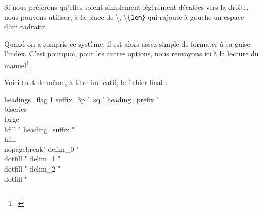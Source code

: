 Si nous préférons qu'elles soient simplement légèrement décalées vers la droite, nous pouvons utiliser, à la place de \textbackslash{}, \textbackslash{}\verb|{1em}| qui rajoute à gauche un espace d'un cadratin. 


Quand on a compris ce système, il est alors assez simple de formater à sa guise l'index. C'est pourquoi, pour les autres options, nous renvoyons ici à la lecture du manuel\footcite[On pourra aussi consulter][]{frama_index}. 

Voici tout de même, à titre indicatif, le fichier final :

\begin{latexcode}
headings_flag 1
suffix_3p "~sq."
heading_prefix " {\\bfseries\\large\\hfill " 
heading_suffix " \\hfill}\\nopagebreak\n " 
delim_0 "\\dotfill "
delim_1 "\\dotfill "
delim_2 "\\dotfill "
\end{latexcode}





